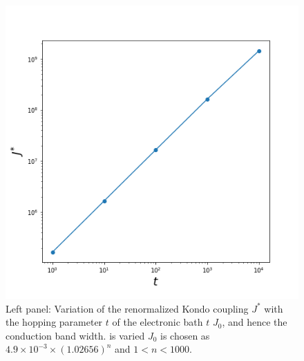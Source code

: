 \documentclass[aps,prl,preprint,groupedaddress]{revtex4-2}
\begin{document}
\begin{figure}
\includegraphics[scale=0.4]{KondoCouplingVst.png}
\caption{Left panel: Variation of the renormalized Kondo coupling $J^{*}$ with the hopping parameter $t$ of the electronic bath $t$ $J_{0}$, and hence the conduction band width.  is varied $J_{0}$ is chosen as $4.9\times 10^{-3}\times(1.02656)^{n}$ and $1<n<1000$.}\label{infinite}
\end{figure}
\end{document}
